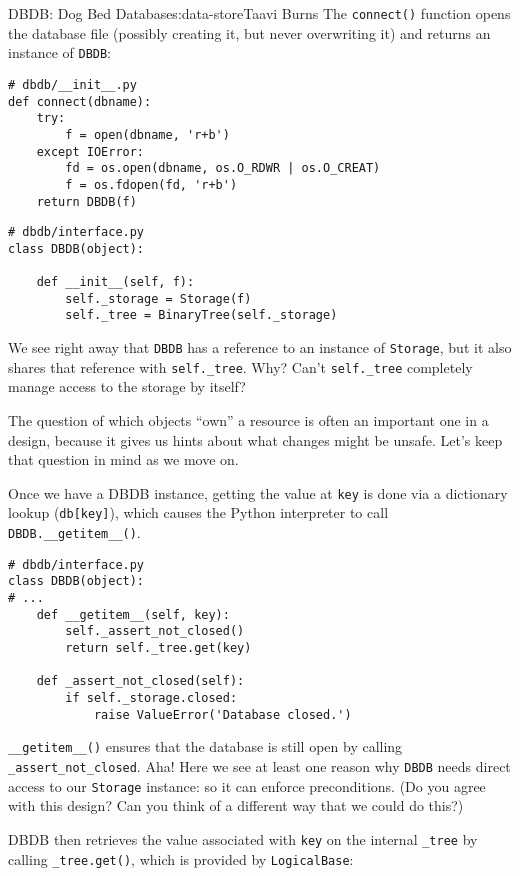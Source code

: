 \begin{aosachapter}{DBDB: Dog Bed Database}{s:data-store}{Taavi Burns}
The \texttt{connect()} function opens the database file (possibly
creating it, but never overwriting it) and returns an instance of
\texttt{DBDB}:

\begin{verbatim}
# dbdb/__init__.py
def connect(dbname):
    try:
        f = open(dbname, 'r+b')
    except IOError:
        fd = os.open(dbname, os.O_RDWR | os.O_CREAT)
        f = os.fdopen(fd, 'r+b')
    return DBDB(f)
\end{verbatim}

\begin{verbatim}
# dbdb/interface.py
class DBDB(object):

    def __init__(self, f):
        self._storage = Storage(f)
        self._tree = BinaryTree(self._storage)
\end{verbatim}

We see right away that \texttt{DBDB} has a reference to an instance of
\texttt{Storage}, but it also shares that reference with
\texttt{self.\_tree}. Why? Can't \texttt{self.\_tree} completely manage
access to the storage by itself?

The question of which objects ``own'' a resource is often an important
one in a design, because it gives us hints about what changes might be
unsafe. Let's keep that question in mind as we move on.

Once we have a DBDB instance, getting the value at \texttt{key} is done
via a dictionary lookup (\texttt{db{[}key{]}}), which causes the Python
interpreter to call \texttt{DBDB.\_\_getitem\_\_()}.

\begin{verbatim}
# dbdb/interface.py
class DBDB(object):
# ...
    def __getitem__(self, key):
        self._assert_not_closed()
        return self._tree.get(key)

    def _assert_not_closed(self):
        if self._storage.closed:
            raise ValueError('Database closed.')
\end{verbatim}

\texttt{\_\_getitem\_\_()} ensures that the database is still open by
calling \texttt{\_assert\_not\_closed}. Aha! Here we see at least one
reason why \texttt{DBDB} needs direct access to our \texttt{Storage}
instance: so it can enforce preconditions. (Do you agree with this
design? Can you think of a different way that we could do this?)

DBDB then retrieves the value associated with \texttt{key} on the
internal \texttt{\_tree} by calling \texttt{\_tree.get()}, which is
provided by \texttt{LogicalBase}:


\end{aosachapter}
